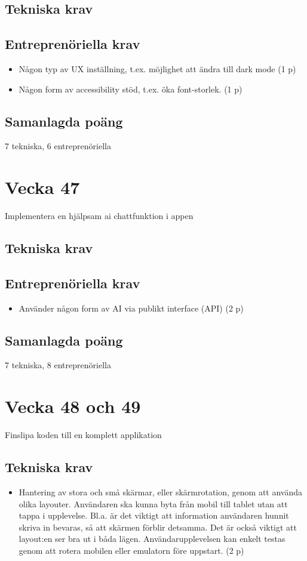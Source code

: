 \documentclass{TDP003mall}
\begin{document}
\subsection{Tekniska krav}

\subsection{Entreprenöriella krav}
\begin{itemize}
    \item Någon typ av UX inställning, t.ex. möjlighet att ändra till dark mode (1 p)
    \item Någon form av accessibility stöd, t.ex. öka font-storlek. (1 p)
\end{itemize}

\subsection{Samanlagda poäng}
7 tekniska, 6 entreprenöriella

\section{Vecka 47}
Implementera en hjälpsam ai chattfunktion i appen

\subsection{Tekniska krav}

\subsection{Entreprenöriella krav}
\begin{itemize}
    \item Använder någon form av AI via publikt interface (API) (2 p)
\end{itemize}

\subsection{Samanlagda poäng}
7 tekniska, 8 entreprenöriella

\section{Vecka 48 och 49}
Finslipa koden till en komplett applikation

\subsection{Tekniska krav}
\begin{itemize}
    \item{Hantering av stora och små skärmar, eller skärmrotation, genom att använda olika layouter. Användaren ska kunna byta från mobil till tablet utan att tappa i upplevelse. Bl.a. är det viktigt att information användaren hunnit skriva in bevaras, så att skärmen förblir detsamma. Det är också viktigt att layout:en ser bra ut i båda lägen. Användarupplevelsen kan enkelt testas genom att rotera mobilen eller emulatorn före uppstart. (2 p)}
\end{itemize}
\end{document}
